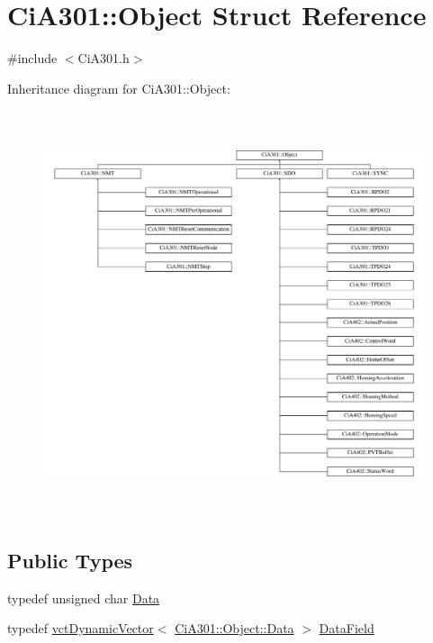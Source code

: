 \hypertarget{struct_ci_a301_1_1_object}{}\section{Ci\+A301\+:\+:Object Struct Reference}
\label{struct_ci_a301_1_1_object}


{\ttfamily \#include $<$Ci\+A301.\+h$>$}

Inheritance diagram for Ci\+A301\+:\+:Object\+:\begin{figure}[H]
\begin{center}
\leavevmode
\includegraphics[height=11.943128cm]{da/d3b/struct_ci_a301_1_1_object}
\end{center}
\end{figure}
\subsection*{Public Types}
\begin{DoxyCompactItemize}
\item 
typedef unsigned char \hyperlink{struct_ci_a301_1_1_object_a9fd091097bb03da4a28a403485c3a10f}{Data}
\item 
typedef \hyperlink{classvct_dynamic_vector}{vct\+Dynamic\+Vector}$<$ \hyperlink{struct_ci_a301_1_1_object_a9fd091097bb03da4a28a403485c3a10f}{Ci\+A301\+::\+Object\+::\+Data} $>$ \hyperlink{struct_ci_a301_1_1_object_a2344da0462f8dd535bbf311be83d435a}{Data\+Field}
\end{DoxyCompactItemize}
